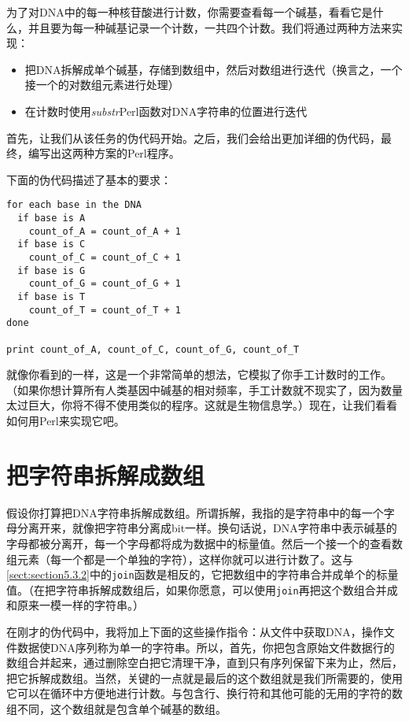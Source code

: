 为了对DNA中的每一种核苷酸进行计数，你需要查看每一个碱基，看看它是什么，并且要为每一种碱基记录一个计数，一共四个计数。我们将通过两种方法来实现：

\begin{itemize}
  \item 把DNA拆解成单个碱基，存储到数组中，然后对数组进行迭代（换言之，一个接一个的对数组元素进行处理）
  \item 在计数时使用\textit{substr}Perl函数对DNA字符串的位置进行迭代
\end{itemize}

首先，让我们从该任务的伪代码开始。之后，我们会给出更加详细的伪代码，最终，编写出这两种方案的Perl程序。

下面的伪代码描述了基本的要求：

\begin{lstlisting}
for each base in the DNA
  if base is A
    count_of_A = count_of_A + 1
  if base is C
    count_of_C = count_of_C + 1
  if base is G
    count_of_G = count_of_G + 1
  if base is T
    count_of_T = count_of_T + 1
done

print count_of_A, count_of_C, count_of_G, count_of_T
\end{lstlisting}

就像你看到的一样，这是一个非常简单的想法，它模拟了你手工计数时的工作。（如果你想计算所有人类基因中碱基的相对频率，手工计数就不现实了，因为数量太过巨大，你将不得不使用类似的程序。这就是生物信息学。）现在，让我们看看如何用Perl来实现它吧。

\section{把字符串拆解成数组}
假设你打算把DNA字符串拆解成数组。所谓拆解，我指的是字符串中的每一个字母分离开来，就像把字符串分离成bit一样。换句话说，DNA字符串中表示碱基的字母都被分离开，每一个字母都将成为数据中的标量值。然后一个接一个的查看数组元素（每一个都是一个单独的字符），这样你就可以进行计数了。这与\autoref{sect:section5.3.2}中的\verb|join|函数是相反的，它把数组中的字符串合并成单个的标量值。（在把字符串拆解成数组后，如果你愿意，可以使用\verb|join|再把这个数组合并成和原来一模一样的字符串。）

在刚才的伪代码中，我将加上下面的这些操作指令：从文件中获取DNA，操作文件数据使DNA序列称为单一的字符串。所以，首先，你把包含原始文件数据行的数组合并起来，通过删除空白把它清理干净，直到只有序列保留下来为止，然后，把它拆解成数组。当然，关键的一点就是最后的这个数组就是我们所需要的，使用它可以在循环中方便地进行计数。与包含行、换行符和其他可能的无用的字符的数组不同，这个数组就是包含单个碱基的数组。

